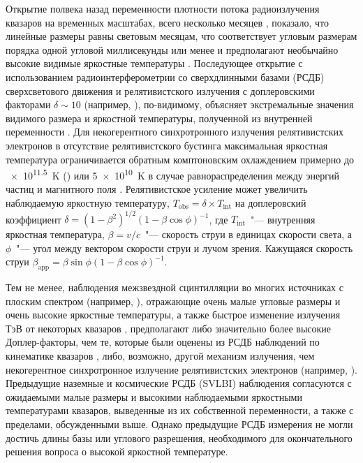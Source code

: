 Открытие полвека назад переменности плотности потока радиоизлучения квазаров на временных
масштабах, всего несколько месяцев \cite{Sholomitsky_1965a,Sholomitsky_1965b,Dent_1965}, показало,
что линейные размеры равны световым месяцам, что соответствует угловым размерам порядка одной
угловой миллисекунды или менее и предполагают необычайно высокие видимые яркостные температуры
\cite{Pauliny_Toth_1066}. Последующее открытие с использованием радиоинтерферометрии со
сверхдлинными базами (РСДБ) сверхсветового движения и релятивистского излучения с доплеровскими
факторами $\delta \sim 10$ (например, \cite{Lister_2013}), по-видимому, объясняет экстремальные
значения видимого размера и яркостной температуры, полученной из внутренней переменности
\cite{Kellermann_1981}.  Для некогерентного синхротронного излучения релятивистских
электронов в отсутствие релятивистского бустинга максимальная яркостная температура
ограничивается обратным комптоновским охлаждением примерно до \SI{e11.5}{\kelvin}
(\cite{Kellermann_1969,Readhead_1994})  или \SI{5e10}{\kelvin} в случае равнораспределения между
энергий частиц и магнитного поля \cite{Readhead_1994}. Релятивистское усиление может увеличить
наблюдаемую яркостную температуру, $T_\text{obs} = \delta \times T_\text{int}$ на доплеровский
коэффициент $\delta = (1 - \beta^2)^{1/2} (1 - \beta \cos\phi)^{-1}$, где $T_\text{int}$~"---
внутренняя яркостная температура, $\beta = v/c$~"--- скорость струи в единицах скорости света, а
$\phi$~"--- угол между вектором скорости струи и лучом зрения. Кажущаяся скорость струи
$\beta_\text{app} = \beta \sin \phi (1 - \beta \cos \phi)^{-1}$.

Тем не менее, наблюдения межзвездной сцинтилляции во многих источниках с плоским спектром (например,
\cite{Lovell_2008}), отражающие очень малые угловые размеры и очень высокие яркостные температуры, а
также быстрое изменение излучения ТэВ от некоторых квазаров \cite{Hinton_2009}, предполагают
либо значительно более высокие Доплер-факторы, чем те, которые были оценены из РСДБ наблюдений
по кинематике квазаров \cite{Lister_2013}, либо, возможно, другой механизм излучения, чем
некогерентное синхротронное излучение релятивистских электронов (например,
\cite{Blandford_Konigl_1979}). Предыдущие наземные \cite{Kovalev_2005,Lee_2008} и
космические \cite{Frey_2000,Tingay_2001,Dodson_2008} РСДБ (SVLBI) наблюдения
согласуются с ожидаемыми малые размеры и высокими наблюдаемыми яркостными температурами квазаров,
выведенные из их собственной переменности, а также с пределами, обсужденными выше. Однако
предыдущие РСДБ измерения не могли достичь длины базы или углового разрешения, необходимого для
окончательного решения вопроса о высокой яркостной температуре.

